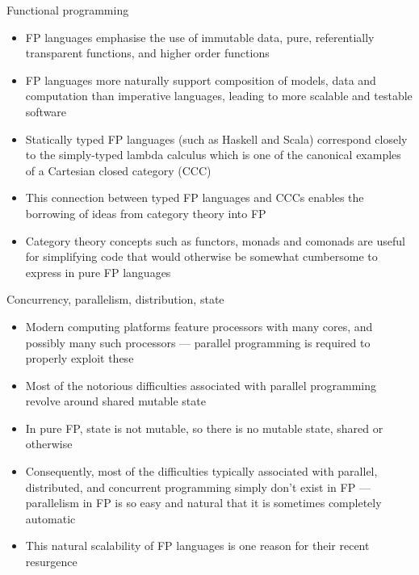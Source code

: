 \documentclass[mathserif,handout]{beamer}
\begin{document}
\begin{frame}{Functional programming}
\protect\hypertarget{functional-programming}{}

\begin{itemize}

\item
  FP languages emphasise the use of \alert{immutable} data, \alert{pure,
  referentially transparent functions}, and \alert{higher order
  functions}
\item
  FP languages more naturally support composition of models, data and
  computation than imperative languages, leading to more scalable and
  testable software
\item
  Statically typed FP languages (such as Haskell and Scala) correspond
  closely to the \alert{simply-typed lambda calculus} which is one of the
  canonical examples of a \alert{Cartesian closed category} (CCC)
\item
  This connection between typed FP languages and CCCs enables the
  borrowing of ideas from category theory into FP
\item
  Category theory concepts such as \alert{functors}, \alert{monads} and
  \alert{comonads} are useful for simplifying code that would otherwise
  be somewhat cumbersome to express in pure FP languages
\end{itemize}

\end{frame}

\begin{frame}{Concurrency, parallelism, distribution, state}
\protect\hypertarget{concurrency-parallelism-distribution-state}{}

\begin{itemize}

\item
  Modern computing platforms feature processors with many cores, and
  possibly many such processors --- parallel programming is required to
  properly exploit these
\item
  Most of the notorious difficulties associated with parallel
  programming revolve around \alert{shared mutable state}
\item
  In pure FP, state is not mutable, so there is no mutable state, shared
  or otherwise
\item
  Consequently, most of the difficulties typically associated with
  parallel, distributed, and concurrent programming simply don't exist in FP ---
  parallelism in FP is so easy and natural that it is sometimes
  completely automatic
\item
  This natural scalability of FP languages is one reason for their
  recent resurgence
\end{itemize}

\end{frame}
\end{document}
